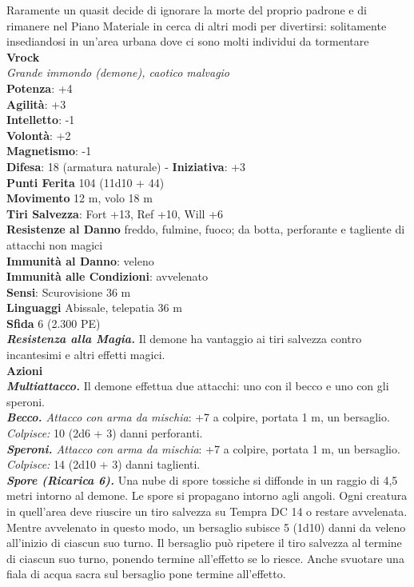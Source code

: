 \begin{multicols}{2}
Raramente un quasit decide di ignorare la morte del proprio padrone e di rimanere nel Piano Materiale in cerca di altri modi per divertirsi: solitamente insediandosi in un'area urbana dove ci sono molti individui da tormentare\\

\medskip\textbf{Vrock}\\
\emph{Grande immondo (demone), caotico malvagio}\\
\textbf{Potenza}: +4\\
\textbf{Agilità}: +3\\
\textbf{Intelletto}: -1\\
\textbf{Volontà}: +2\\
\textbf{Magnetismo}: -1\\
\textbf{Difesa}: 18 (armatura naturale) - \textbf{Iniziativa}: +3\\
\textbf{Punti Ferita} 104 (11d10 + 44)\\
\textbf{Movimento} 12 m, volo 18 m\\
\textbf{Tiri Salvezza}: Fort +13, Ref +10, Will +6\\
\textbf{Resistenze al Danno} freddo, fulmine, fuoco; da botta, perforante e tagliente di attacchi non magici\\
\textbf{Immunità al Danno}: veleno\\
\textbf{Immunità alle Condizioni}: avvelenato\\
\textbf{Sensi}: Scurovisione 36 m \\
\textbf{Linguaggi} Abissale, telepatia 36 m \\
\textbf{Sfida} 6 (2.300 PE)\smallskip\\
\emph{\textbf{Resistenza alla Magia.}} Il demone ha vantaggio ai tiri salvezza contro incantesimi e altri effetti magici.\\
\smallskip\textbf{Azioni}\\
\emph{\textbf{Multiattacco.}} Il demone effettua due attacchi: uno con il becco e uno con gli speroni.\\
\emph{\textbf{Becco.} Attacco con arma da mischia}: +7 a colpire, portata 1 m, un bersaglio.\\
\emph{Colpisce:} 10 (2d6 + 3) danni perforanti.\\
\emph{\textbf{Speroni.} Attacco con arma da mischia}: +7 a colpire, portata 1 m, un bersaglio.\\
\emph{Colpisce:} 14 (2d10 + 3) danni taglienti.\\
\emph{\textbf{Spore (Ricarica 6).}} Una nube di spore tossiche si diffonde in un raggio di 4,5 metri intorno al demone. Le spore si propagano intorno agli angoli. Ogni creatura in quell'area deve riuscire un tiro salvezza su Tempra DC 14 o restare avvelenata. Mentre  avvelenato in questo modo, un bersaglio subisce 5 (1d10) danni da veleno all'inizio di ciascun suo turno. Il bersaglio può ripetere il tiro salvezza al termine di ciascun suo turno, ponendo termine all'effetto se lo riesce. Anche svuotare una fiala di acqua sacra sul bersaglio pone termine all'effetto.\\

\end{multicols}
